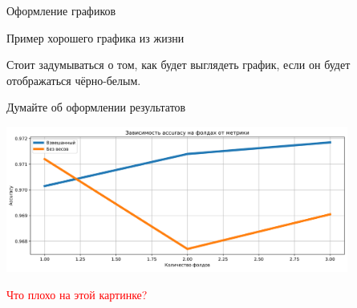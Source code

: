 \documentclass[fleqn, xcolor=x11names]{beamer}
\begin{document}
\begin{section}{Оформление графиков}
\begin{frame}{Пример хорошего графика из жизни}
	\begin{center}
	\end{center}
	Стоит задумываться о том, как будет выглядеть график, если он будет отображаться чёрно-белым.
\end{frame}

\begin{frame}{Думайте об оформлении результатов}
    \begin{center}
        {\includegraphics[height=4.8cm]{bad_graphic.png}}
    \end{center}

    \textcolor{red}{Что плохо на этой картинке?}
    \end{frame}

\end{section}
\end{document}
